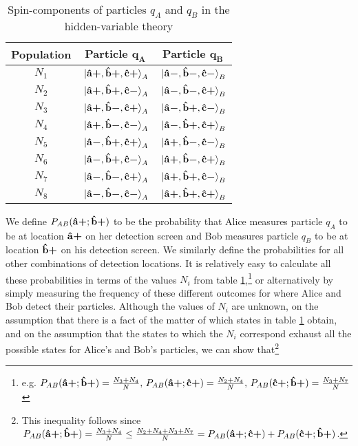       \begin{table}[ht]
      \caption{Spin-components of particles $q_A$ and $q_B$ in the hidden-variable theory}
      \centering
      \begin{tabular}{c c c} 
      \\ 
      \hline
      \textbf{Population}& \textbf{Particle} $\bm{q_A}$ & \textbf{Particle} $\bm{q_B}$ \\ [0.5ex] 
      \hline
      $N_1$ & $\ket*{\vb{\hat{{a}}}\bm{+},\vb{\hat{{b}}}\bm{+},\vb{\hat{{c}}}\bm{+}}_A$ & $\ket*{\vb{\hat{{a}}}\bm{-},\vb{\hat{{b}}}\bm{-},\vb{\hat{{c}}}\bm{-}}_B$ \\ 
      
      $N_2$ & $\ket*{\vb{\hat{{a}}}\bm{+},\vb{\hat{{b}}}\bm{+},\vb{\hat{{c}}}\bm{-}}_A$ & $\ket*{\vb{\hat{{a}}}\bm{-},\vb{\hat{{b}}}\bm{-},\vb{\hat{{c}}}\bm{+}}_B $\\ 
      
      $N_3$ & $\ket*{\vb{\hat{{a}}}\bm{+},\vb{\hat{{b}}}\bm{-},\vb{\hat{{c}}}\bm{+}}_A$ & $\ket*{\vb{\hat{{a}}}\bm{-},\vb{\hat{{b}}}\bm{+},\vb{\hat{{c}}}\bm{-}}_B$ \\ 
      
      $N_4$ & $\ket*{\vb{\hat{{a}}}\bm{+},\vb{\hat{{b}}}\bm{-},\vb{\hat{{c}}}\bm{-}}_A$ & $\ket*{\vb{\hat{{a}}}\bm{-},\vb{\hat{{b}}}\bm{+},\vb{\hat{{c}}}\bm{+}}_B $\\ 
      
      $N_5$ & $\ket*{\vb{\hat{{a}}}\bm{-},\vb{\hat{{b}}}\bm{+},\vb{\hat{{c}}}\bm{+}}_A$ & $\ket*{\vb{\hat{{a}}}\bm{+},\vb{\hat{{b}}}\bm{-},\vb{\hat{{c}}}\bm{-}}_B$ \\ 
      
      $N_6$ & $\ket*{\vb{\hat{{a}}}\bm{-},\vb{\hat{{b}}}\bm{+},\vb{\hat{{c}}}\bm{-}}_A$ & $\ket*{\vb{\hat{{a}}}\bm{+},\vb{\hat{{b}}}\bm{-},\vb{\hat{{c}}}\bm{+}}_B$ \\ 
      
      $N_7$ & $\ket*{\vb{\hat{{a}}}\bm{-},\vb{\hat{{b}}}\bm{-},\vb{\hat{{c}}}\bm{+}}_A$ & $\ket*{\vb{\hat{{a}}}\bm{+},\vb{\hat{{b}}}\bm{+},\vb{\hat{{c}}}\bm{-} }_B$\\ 
      
      $N_8$ & $\ket*{\vb{\hat{{a}}}\bm{-},\vb{\hat{{b}}}\bm{-},\vb{\hat{{c}}}\bm{-}}_A$ & $\ket*{\vb{\hat{{a}}}\bm{+},\vb{\hat{{b}}}\bm{+},\vb{\hat{{c}}}\bm{+}}_B$ \\ 
      \hline
      \end{tabular}
      \label{hiddentable}
      \end{table}
       We define $P_{AB}(\vb{\hat{{a}}}\bm{+};\vb{\hat{{b}}}\bm{+})$ to be the probability that Alice measures particle $q_A$ to be at location $\vb{\hat{{a}}}\bm{+}$ on her detection screen and Bob measures particle $q_B$ to be at location $\vb{\hat{{b}}}\bm{+}$ on his detection screen. We similarly define the probabilities for all other combinations of detection locations. It is relatively easy to calculate all these probabilities in terms of the values $N_i$ from table \ref{hiddentable},\footnote{e.g.  $P_{AB}(\vb{\hat{{a}}}\bm{+};\vb{\hat{{b}}}\bm{+})=\frac{N_3+N_4}{N},\, P_{AB}(\vb{\hat{{a}}}\bm{+};\vb{\hat{{c}}}\bm{+})=\frac{N_2+N_4}{N},\,P_{AB}(\vb{\hat{{c}}}\bm{+};\vb{\hat{{b}}}\bm{+})=\frac{N_3+N_7}{N}$  } or alternatively by simply measuring the frequency of these different outcomes for where Alice and Bob detect their particles. Although the values of $N_i$ are unknown, on the assumption that there is a fact of the matter of which states in table \ref{hiddentable} obtain, and on the assumption that the states to which the $N_i$ correspond exhaust all the possible states for Alice's and Bob's particles, we can show that\footnote{This inequality follows since $P_{AB}(\vb{\hat{{a}}}\bm{+};\vb{\hat{{b}}}\bm{+})=\frac{N_3+N_4}{N}\leq \frac{N_2+N_4+N_3+N_7}{N}=P_{AB}(\vb{\hat{{a}}}\bm{+};\vb{\hat{{c}}}\bm{+})+P_{AB}(\vb{\hat{{c}}}\bm{+};\vb{\hat{{b}}}\bm{+})$.}
